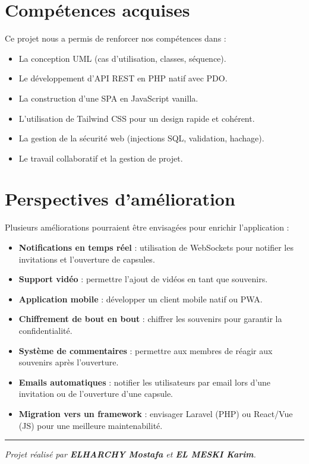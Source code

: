 \documentclass[12pt,a4paper]{report}
\begin{document}
\section{Compétences acquises}

Ce projet nous a permis de renforcer nos compétences dans :
\begin{itemize}[noitemsep]
    \item La conception UML (cas d'utilisation, classes, séquence).
    \item Le développement d'API REST en PHP natif avec PDO.
    \item La construction d'une SPA en JavaScript vanilla.
    \item L'utilisation de Tailwind CSS pour un design rapide et cohérent.
    \item La gestion de la sécurité web (injections SQL, validation, hachage).
    \item Le travail collaboratif et la gestion de projet.
\end{itemize}

\section{Perspectives d'amélioration}

Plusieurs améliorations pourraient être envisagées pour enrichir l'application :
\begin{itemize}[noitemsep]
    \item \textbf{Notifications en temps réel} : utilisation de WebSockets pour notifier les invitations et l'ouverture de capsules.
    \item \textbf{Support vidéo} : permettre l'ajout de vidéos en tant que souvenirs.
    \item \textbf{Application mobile} : développer un client mobile natif ou PWA.
    \item \textbf{Chiffrement de bout en bout} : chiffrer les souvenirs pour garantir la confidentialité.
    \item \textbf{Système de commentaires} : permettre aux membres de réagir aux souvenirs après l'ouverture.
    \item \textbf{Emails automatiques} : notifier les utilisateurs par email lors d'une invitation ou de l'ouverture d'une capsule.
    \item \textbf{Migration vers un framework} : envisager Laravel (PHP) ou React/Vue (JS) pour une meilleure maintenabilité.
\end{itemize}

\vspace{1cm}
\noindent\rule{\textwidth}{0.4pt}
\vspace{0.3cm}

\begin{center}
    \textit{Projet réalisé par \textbf{ELHARCHY Mostafa} et \textbf{EL MESKI Karim}.}
\end{center}
\end{document}
